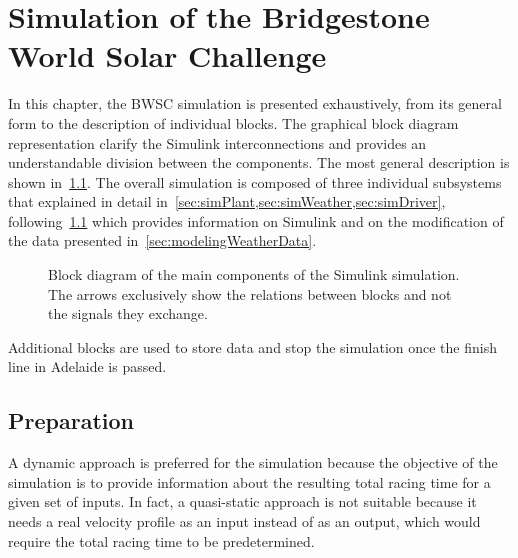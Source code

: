 
\chapter{Simulation of the Bridgestone World Solar Challenge}
\label{chp:simulation}
In this chapter, the BWSC simulation is presented exhaustively, from its general form to the description of individual blocks. The graphical block diagram representation clarify the Simulink interconnections and provides an understandable division between the components. The most general description is shown in~\cref{fig:simOverview}. The overall simulation is composed of three individual subsystems that explained in detail in~\cref{sec:simPlant,sec:simWeather,sec:simDriver}, following~\cref{sec:simPreparation} which provides information on Simulink and on the modification of the data presented in~\cref{sec:modelingWeatherData}.
\begin{figure}[htbp]
	\centering
	
	\caption{Block diagram of the main components of the Simulink simulation. The arrows exclusively show the relations between blocks and not the signals they exchange.}
	\label{fig:simOverview}
\end{figure}

Additional blocks are used to store data and stop the simulation once the finish line in Adelaide is passed.

\newpage
\section{Preparation}
\label{sec:simPreparation}
A dynamic approach is preferred for the simulation because the objective of the simulation is to provide information about the resulting total racing time for a given set of inputs. In fact, a quasi-static approach is not suitable because it needs a real velocity profile as an input instead of as an output, which would require the total racing time to be predetermined.

